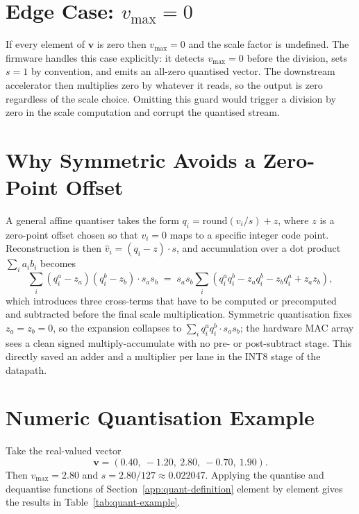\documentclass[oneside]{ecsproject}    %
\begin{document}
\section{Edge Case: $v_{\max} = 0$}
\label{app:quant-edge}

If every element of $\mathbf{v}$ is zero then $v_{\max} = 0$ and the scale
factor is undefined. The firmware handles this case explicitly: it detects
$v_{\max} = 0$ before the division, sets $s = 1$ by convention, and emits an
all-zero quantised vector. The downstream accelerator then multiplies zero
by whatever it reads, so the output is zero regardless of the scale choice.
Omitting this guard would trigger a division by zero in the scale
computation and corrupt the quantised stream.

\section{Why Symmetric Avoids a Zero-Point Offset}
\label{app:quant-zp}

A general affine quantiser takes the form
$q_i = \mathrm{round}(v_i / s) + z$, where $z$ is a zero-point offset chosen
so that $v_i = 0$ maps to a specific integer code point. Reconstruction is
then $\hat{v}_i = (q_i - z) \cdot s$, and accumulation over a dot product
$\sum_i a_i b_i$ becomes
\[
  \sum_i (q^a_i - z_a)(q^b_i - z_b) \cdot s_a s_b
  \;=\; s_a s_b \sum_i \left(
      q^a_i q^b_i - z_a q^b_i - z_b q^a_i + z_a z_b
    \right),
\]
which introduces three cross-terms that have to be computed or precomputed
and subtracted before the final scale multiplication. Symmetric quantisation
fixes $z_a = z_b = 0$, so the expansion collapses to
$\sum_i q^a_i q^b_i \cdot s_a s_b$; the hardware MAC array sees a clean
signed multiply-accumulate with no pre- or post-subtract stage. This directly
saved an adder and a multiplier per lane in the INT8 stage of the datapath.

\section{Numeric Quantisation Example}
\label{app:quant-example}

Take the real-valued vector
\[
  \mathbf{v} = (0.40,\ -1.20,\ 2.80,\ -0.70,\ 1.90).
\]
Then $v_{\max} = 2.80$ and $s = 2.80 / 127 \approx 0.022047$. Applying the
quantise and dequantise functions of Section~\ref{app:quant-definition}
element by element gives the results in Table~\ref{tab:quant-example}.
\end{document}
